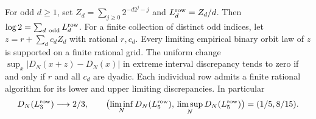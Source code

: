 \documentclass[11pt]{article}
\begin{document}
\begin{theorem}\label{th:horizontal}
For odd $d\ge1$, set $Z_d=\sum_{j\ge0}2^{-d2^j-j}$ and $L_d^{\rm row}=Z_d/d$. Then $\log2=\sum_{d\ {\rm odd}}L_d^{\rm row}$. For a finite collection of distinct odd indices, let $z=r+\sum_d c_d Z_d$ with rational $r,c_d$. Every limiting empirical binary orbit law of $z$ is supported on a finite rational grid. The uniform change $\sup_x|D_N(x+z)-D_N(x)|$ in extreme interval discrepancy tends to zero if and only if $r$ and all $c_d$ are dyadic. Each individual row admits a finite rational algorithm for its lower and upper limiting discrepancies. In particular
\[
 D_N(L_3^{\rm row})\longrightarrow2/3,\qquad
 \bigl(\liminf_N D_N(L_5^{\rm row}),\,\limsup_N D_N(L_5^{\rm row})\bigr)
      =(1/5,8/15).
\]
\end{theorem}
\end{document}
